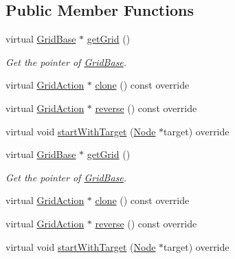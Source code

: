 \subsection*{Public Member Functions}
\begin{DoxyCompactItemize}
\item 
virtual \hyperlink{classGridBase}{Grid\+Base} $\ast$ \hyperlink{classGridAction_abb96dc546ce69541bd233b7c2f240add}{get\+Grid} ()
\begin{DoxyCompactList}\small\item\em Get the pointer of \hyperlink{classGridBase}{Grid\+Base}. \end{DoxyCompactList}\item 
virtual \hyperlink{classGridAction}{Grid\+Action} $\ast$ \hyperlink{classGridAction_a081a9340e9289cf2dcbb6bde121d4f24}{clone} () const override
\item 
virtual \hyperlink{classGridAction}{Grid\+Action} $\ast$ \hyperlink{classGridAction_a30591fa53babcd92fb490762fe55b3f7}{reverse} () const override
\item 
virtual void \hyperlink{classGridAction_a33e2c1bc95bbcf6b16428097b4fd4b61}{start\+With\+Target} (\hyperlink{classNode}{Node} $\ast$target) override
\item 
virtual \hyperlink{classGridBase}{Grid\+Base} $\ast$ \hyperlink{classGridAction_a0c0b1f2190d1996c7ecef7a1f51cc869}{get\+Grid} ()
\begin{DoxyCompactList}\small\item\em Get the pointer of \hyperlink{classGridBase}{Grid\+Base}. \end{DoxyCompactList}\item 
virtual \hyperlink{classGridAction}{Grid\+Action} $\ast$ \hyperlink{classGridAction_a081a9340e9289cf2dcbb6bde121d4f24}{clone} () const override
\item 
virtual \hyperlink{classGridAction}{Grid\+Action} $\ast$ \hyperlink{classGridAction_a8f8923dee278b81fdc37bf826ee1d469}{reverse} () const override
\item 
virtual void \hyperlink{classGridAction_a04dfa701007c415bb130766c99357334}{start\+With\+Target} (\hyperlink{classNode}{Node} $\ast$target) override
\end{DoxyCompactItemize}
